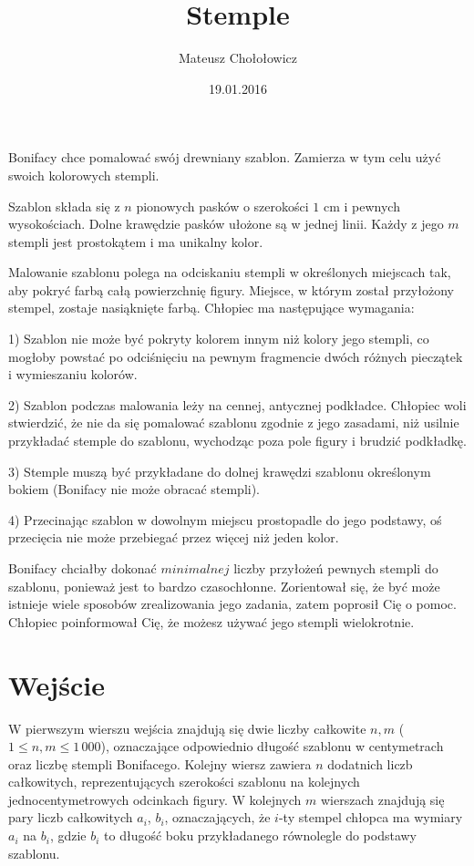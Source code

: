 \documentclass[zad,zawodnik,utf8]{sinol}
\title{Stemple}
\author{Mateusz Chołołowicz} %
\date{19.01.2016}
\begin{document}
  \begin{tasktext}%
Bonifacy chce pomalować swój drewniany szablon. Zamierza w tym celu użyć swoich kolorowych stempli.

Szablon składa się z $n$ pionowych pasków o szerokości $1$ cm i pewnych wysokościach.
Dolne krawędzie pasków ułożone są w jednej linii. Każdy z jego $m$ stempli jest prostokątem i ma unikalny kolor.

Malowanie szablonu polega na odciskaniu stempli w określonych miejscach tak, aby pokryć farbą całą powierzchnię figury.
Miejsce, w którym został przyłożony stempel, zostaje nasiąknięte farbą.
Chłopiec ma następujące wymagania:

1) Szablon nie może być pokryty kolorem innym niż kolory jego stempli, co mogłoby powstać po odciśnięciu na pewnym
fragmencie dwóch różnych pieczątek i wymieszaniu kolorów.

2) Szablon podczas malowania leży na cennej, antycznej podkładce. Chłopiec woli stwierdzić, że nie da się pomalować
szablonu zgodnie z jego zasadami, niż usilnie przykładać stemple do szablonu, wychodząc poza pole figury i brudzić
podkładkę.

3) Stemple muszą być przykładane do dolnej krawędzi szablonu określonym bokiem (Bonifacy nie może obracać stempli).

4) Przecinając szablon w dowolnym miejscu prostopadle do jego podstawy, oś przecięcia nie może przebiegać
przez więcej niż jeden kolor.

Bonifacy chciałby dokonać $minimalnej$ liczby przyłożeń pewnych stempli do szablonu, ponieważ jest to bardzo
czasochłonne. Zorientował się, że być może istnieje wiele sposobów zrealizowania jego zadania, zatem poprosił
Cię o pomoc. Chłopiec poinformował Cię, że możesz używać jego stempli wielokrotnie.

 \section{Wejście}

W pierwszym wierszu wejścia znajdują się dwie liczby całkowite $n, m$ ($1 \leq n, m \leq 1\,000$), oznaczające
odpowiednio długość szablonu w centymetrach oraz liczbę stempli Bonifacego.
Kolejny wiersz zawiera $n$ dodatnich liczb całkowitych, reprezentujących szerokości szablonu na kolejnych
jednocentymetrowych odcinkach figury.
W kolejnych $m$ wierszach znajdują się pary liczb całkowitych $a_i$, $b_i$, oznaczających, że $i$-ty stempel
chłopca ma wymiary $a_i$ na $b_i$, gdzie $b_i$ to długość boku przykładanego równolegle do podstawy szablonu.


\end{tasktext}
\end{document}
